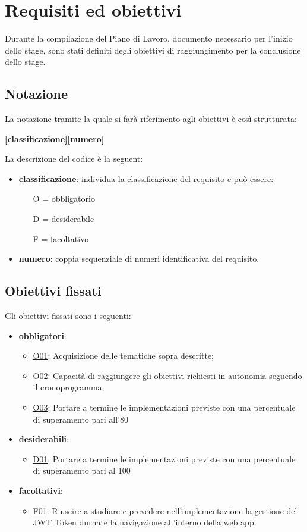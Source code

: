 \section{Requisiti ed obiettivi}
Durante la compilazione del Piano di Lavoro, documento necessario per l'inizio dello stage, sono stati definiti degli obiettivi di raggiungimento per la conclusione dello stage.

\subsection{Notazione}
La notazione tramite la quale si farà riferimento agli obiettivi è così strutturata:
\begin{center}
	\textbf{[classificazione][numero]}
\end{center}
La descrizione del codice è la seguent:
\begin{itemize}
	\item \textbf{classificazione}: individua la classificazione del requisito e può essere:
	\begin{itemize}
		\item [O =] obbligatorio
		\item [D =] desiderabile
		\item [F =] facoltativo
	\end{itemize}
\item \textbf{numero}: coppia sequenziale di numeri identificativa del requisito.
\end{itemize}
\subsection{Obiettivi fissati}
Gli obiettivi fissati sono i seguenti:
\begin{itemize}
	\item \textbf{obbligatori}:
	\begin{itemize}
		\item \underline{O01}: Acquisizione delle tematiche sopra descritte;
		\item \underline{O02}: Capacità di raggiungere gli obiettivi richiesti in autonomia seguendo il cronoprogramma;
		\item \underline{O03}: Portare a termine le implementazioni previste con una percentuale di superamento pari all'80%
	\end{itemize}
	\item \textbf{desiderabili}:
	\begin{itemize}
		\item \underline{D01}: Portare a termine le implementazioni previste con una percentuale di superamento pari al 100%
	\end{itemize}
	\item \textbf{facoltativi}:
	\begin{itemize}
		\item \underline{F01}: Riuscire a studiare e prevedere nell'implementazione la gestione del JWT Token durnate la navigazione all'interno della web app.
	\end{itemize}
\end{itemize}